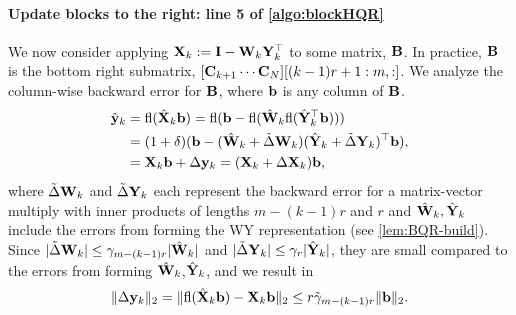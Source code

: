 \paragraph{Update blocks to the right: line 5 of \cref{algo:blockHQR}}
We now consider applying $\mathbf{X}_{k}:=\mathbf{I}-\mathbf{W}_k\mathbf{Y}_k^{\top}$ to some matrix, $\mathbf{B}$.
In practice, $\mathbf{B}$ is the bottom right submatrix, $[\mathbf{C}_{k+1}\cdots \mathbf{C}_{N}][(k-1)r+1:m,:]$.
We analyze the column-wise backward error for $\mathbf{B}$, where $\mathbf{b}$ is any column of $\mathbf{B}$.
\begin{align*}
\hat{\mathbf{y}}_k&=\mathrm{fl}(\hat{\mathbf{X}}_{k}\mathbf{b})=\mathrm{fl}(\mathbf{b} - \mathrm{fl}(\hat{\mathbf{W}}_{k}\mathrm{fl}(\hat{\mathbf{Y}}_{k}^{\top}\mathbf{b}))) \\
&=(1+\delta)(\mathbf{b} - (\hat{\mathbf{W}}_{k} + \tilde{\Delta} \mathbf{W}_{k}) (\hat{\mathbf{Y}}_{k} + \tilde{\Delta} \mathbf{Y}_{k})^{\top}\mathbf{b}),\\
&=\mathbf{X}_k\mathbf{b}+\Delta\mathbf{y}_k= (\mathbf{X}_{k} + \Delta \mathbf{X}_{k})\mathbf{b},
\end{align*}
where $\tilde{\Delta} \mathbf{W}_{k}$ and $\tilde{\Delta} \mathbf{Y}_{k}$ each represent the backward error for a matrix-vector multiply with inner products of lengths $m-(k-1)r$ and $r$ and $\hat{\mathbf{W}}_{k},\hat{\mathbf{Y}}_k$ include the errors from forming the WY representation (see \cref{lem:BQR-build}).
Since $|\tilde{\Delta} \mathbf{W}_{k}| \leq \gamma_{m-(k-1)r}|\hat{\mathbf{W}}_{k}|$ and $|\tilde{\Delta} \mathbf{Y}_{k}| \leq \gamma_{r}|\hat{\mathbf{Y}}_{k}|$, they are small compared to the errors from forming $\hat{\mathbf{W}}_k$,$\hat{\mathbf{Y}}_k$, and we result in
\begin{equation*}
\|\Delta \mathbf{y}_k\|_2= \|\mathrm{fl}(\hat{\mathbf{X}}_{k}\mathbf{b}) - \mathbf{X}_k\mathbf{b}\|_2 \leq  r\tilde{\gamma}_{m-(k-1)r}\|\mathbf{b}\|_2.
\end{equation*}
